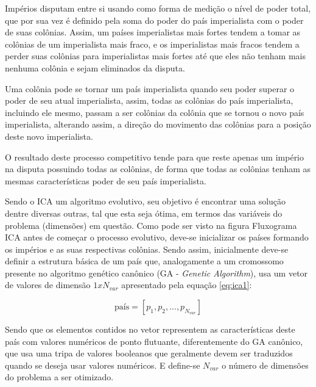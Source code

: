 Impérios disputam entre si usando como forma de medição o nível de poder total, que por sua vez é definido pela soma do poder do país imperialista com o poder de suas colônias. Assim, um países imperialistas mais fortes tendem a tomar as colônias de um imperialista mais fraco, e os imperialistas mais fracos tendem a perder suas colônias para imperialistas mais fortes até que eles não tenham mais nenhuma colônia e sejam eliminados da disputa. 

Uma colônia pode se tornar um país imperialista quando seu poder superar o poder de seu atual imperialista, assim, todas as colônias do país imperialista, incluindo ele mesmo, passam a ser colônias da colônia que se tornou o novo país imperialista, alterando assim, a direção do movimento das colônias para a posição deste novo imperialista.

O resultado deste processo competitivo tende para que reste apenas um império na disputa possuindo todas as colônias, de forma que todas as colônias tenham as mesmas características poder de seu país imperialista.

Sendo o ICA um algoritmo evolutivo, seu objetivo é encontrar uma solução dentre diversas outras, tal que esta seja ótima, em termos das variáveis do problema (dimensões) em questão.  Como pode ser visto na figura Fluxograma ICA antes de começar o processo evolutivo, deve-se inicializar os países formando os impérios e as suas respectivas colônias. Sendo assim, inicialmente deve-se definir a estrutura básica de um país que, analogamente a um cromossomo presente no algoritmo genético canônico (GA - \emph{Genetic Algorithm}), usa um vetor de valores de dimensão \(1xN_{var}\) apresentado pela equação \ref{eq:ica1}:

\begin{equation}
\label{eq:ica1}
\text{país} = [p_{1},p_{2},...,p_{N_{var}}] 
\end{equation}

Sendo que os elementos contidos no vetor representem as características deste país com valores numéricos de ponto flutuante, diferentemente do GA canônico, que usa uma tripa de valores booleanos que geralmente devem ser traduzidos quando se deseja usar valores numéricos. E define-se \(N_{var}\) o número de dimensões do problema a ser otimizado. 

